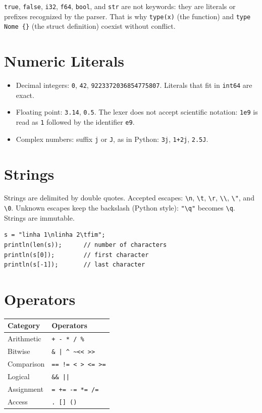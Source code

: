 \documentclass[11pt,a4paper,oneside]{report}
\newcommand{\code}[1]{\texttt{#1}}
\begin{document}
\code{true}, \code{false}, \code{i32}, \code{f64}, \code{bool}, and
\code{str} are not keywords: they are literals or prefixes recognized by
the parser. That is why \code{type(x)} (the function) and
\code{type Nome \{\}} (the struct definition) coexist without conflict.

\section{Numeric Literals}
\begin{itemize}
  \item Decimal integers: \code{0}, \code{42}, \code{9223372036854775807}.
        Literals that fit in \code{int64} are exact.
  \item Floating point: \code{3.14}, \code{0.5}. The lexer does not accept
        scientific notation: \code{1e9} is read as \code{1} followed by the
        identifier \code{e9}.
  \item Complex numbers: suffix \code{j} or \code{J}, as in Python:
        \code{3j}, \code{1+2j}, \code{2.5J}.
\end{itemize}

\section{Strings}
Strings are delimited by double quotes. Accepted escapes:
\code{\textbackslash n}, \code{\textbackslash t},
\code{\textbackslash r}, \code{\textbackslash\textbackslash},
\code{\textbackslash "}, and \code{\textbackslash 0}. Unknown escapes
keep the backslash (Python style): \code{"\textbackslash q"} becomes
\code{\textbackslash q}. Strings are immutable.

\begin{lstlisting}
s = "linha 1\nlinha 2\tfim";
println(len(s));      // number of characters
println(s[0]);        // first character
println(s[-1]);       // last character
\end{lstlisting}

\section{Operators}
\begin{center}
\begin{tabular}{ll}
\toprule
Category & Operators \\
\midrule
Arithmetic & \code{+  -  *  /  \%} \\
Bitwise & \code{\&  |  \^{}  \textasciitilde  <<  >>} \\
Comparison & \code{==  !=  <  >  <=  >=} \\
Logical & \code{\&\&  ||} \\
Assignment & \code{=  +=  -=  *=  /=} \\
Access & \code{.  []  ()} \\
\bottomrule
\end{tabular}
\end{center}
\end{document}
